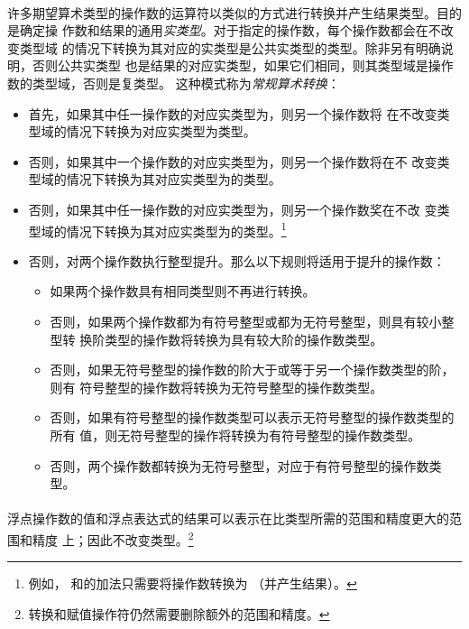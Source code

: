 {\paragraph{}
许多期望算术类型的操作数的运算符以类似的方式进行转换并产生结果类型。目的是确定操
作数和结果的通用\textit{实类型}。对于指定的操作数，每个操作数都会在不改变类型域
的情况下转换为其对应的实类型是公共实类型的类型。除非另有明确说明，否则公共实类型
也是结果的对应实类型，如果它们相同，则其类型域是操作数的类型域，否则是复类型。
这种模式称为\textit{常规算术转换}：
\begin{itemize}
  \item{首先，如果其中任一操作数的对应实类型为，则另一个操作数将
    在不改变类型域的情况下转换为对应实类型为类型。}
  \item{否则，如果其中一个操作数的对应实类型为，则另一个操作数将在不
    改变类型域的情况下转换为其对应实类型为的类型。}
  \item{否则，如果其中任一操作数的对应实类型为，则另一个操作数奖在不改
    变类型域的情况下转换为其对应实类型为的类型。\footnote{例如，
    和的加法只需要将操作数转换为
    （并产生结果）。}}
  \item{否则，对两个操作数执行整型提升。那么以下规则将适用于提升的操作数：
    \begin{itemize}
      \item{如果两个操作数具有相同类型则不再进行转换。}
      \item{否则，如果两个操作数都为有符号整型或都为无符号整型，则具有较小整型转
        换阶类型的操作数将转换为具有较大阶的操作数类型。}
      \item{否则，如果无符号整型的操作数的阶大于或等于另一个操作数类型的阶，则有
        符号整型的操作数将转换为无符号整型的操作数类型。}
      \item{否则，如果有符号整型的操作数类型可以表示无符号整型的操作数类型的所有
        值，则无符号整型的操作将转换为有符号整型的操作数类型。}
      \item{否则，两个操作数都转换为无符号整型，对应于有符号整型的操作数类型。}
    \end{itemize}}
\end{itemize}

\paragraph{}
浮点操作数的值和浮点表达式的结果可以表示在比类型所需的范围和精度更大的范围和精度
上；因此不改变类型。\footnote{转换和赋值操作符仍然需要删除额外的范围和精度。}

}

